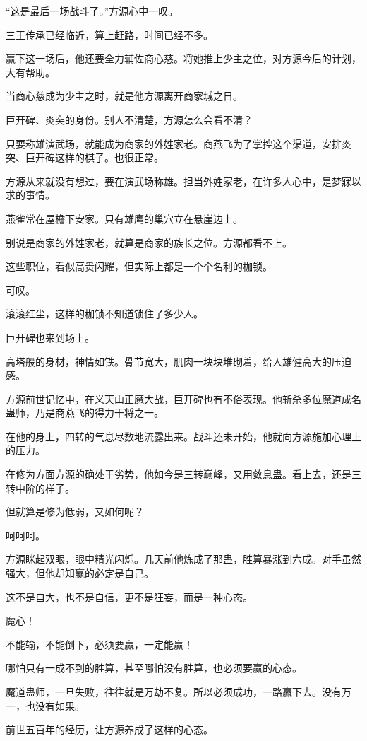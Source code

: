 \begin{this_body}
“这是最后一场战斗了。”方源心中一叹。

三王传承已经临近，算上赶路，时间已经不多。

赢下这一场后，他还要全力辅佐商心慈。将她推上少主之位，对方源今后的计划，大有帮助。

当商心慈成为少主之时，就是他方源离开商家城之日。

巨开碑、炎突的身份。别人不清楚，方源怎么会看不清？

只要称雄演武场，就能成为商家的外姓家老。商燕飞为了掌控这个渠道，安排炎突、巨开碑这样的棋子。也很正常。

方源从来就没有想过，要在演武场称雄。担当外姓家老，在许多人心中，是梦寐以求的事情。

燕雀常在屋檐下安家。只有雄鹰的巢穴立在悬崖边上。

别说是商家的外姓家老，就算是商家的族长之位。方源都看不上。

这些职位，看似高贵闪耀，但实际上都是一个个名利的枷锁。

可叹。

滚滚红尘，这样的枷锁不知道锁住了多少人。

巨开碑也来到场上。

高塔般的身材，神情如铁。骨节宽大，肌肉一块块堆砌着，给人雄健高大的压迫感。

方源前世记忆中，在义天山正魔大战，巨开碑也有不俗表现。他斩杀多位魔道成名蛊师，乃是商燕飞的得力干将之一。

在他的身上，四转的气息尽数地流露出来。战斗还未开始，他就向方源施加心理上的压力。

在修为方面方源的确处于劣势，他如今是三转巅峰，又用敛息蛊。看上去，还是三转中阶的样子。

但就算是修为低弱，又如何呢？

呵呵呵。

方源眯起双眼，眼中精光闪烁。几天前他炼成了那蛊，胜算暴涨到六成。对手虽然强大，但他却知赢的必定是自己。

这不是自大，也不是自信，更不是狂妄，而是一种心态。

魔心！

不能输，不能倒下，必须要赢，一定能赢！

哪怕只有一成不到的胜算，甚至哪怕没有胜算，也必须要赢的心态。

魔道蛊师，一旦失败，往往就是万劫不复。所以必须成功，一路赢下去。没有万一，也没有如果。

前世五百年的经历，让方源养成了这样的心态。


\end{this_body}
